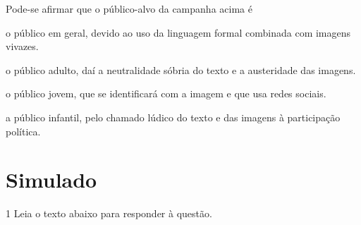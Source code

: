 Pode-se afirmar que o público-alvo da campanha acima é

\begin{escolha}

    \item o público em geral, devido ao uso da linguagem formal combinada com imagens vivazes.
    
    \item o público adulto, daí a neutralidade sóbria do texto e a austeridade das imagens. 
    
    \item o público jovem, que se identificará com a imagem e que usa redes sociais.  
    
    \item a público infantil, pelo chamado lúdico do texto e das imagens à participação política. 

\end{escolha}


\chapter[Simulado 2]{Simulado}

\num{1} Leia o texto abaixo para responder à questão.

